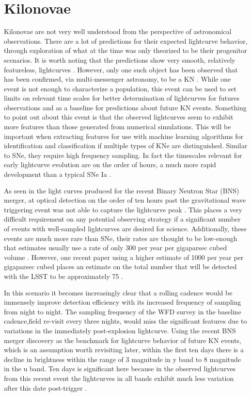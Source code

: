 \documentclass[12pt]{article}
\begin{document}
\section{Kilonovae} %
Kilonovae are not very well understood from the perspective of astronomical observations. There are a lot of predictions for their expected lightcurve behavior, through exploration of what at the time was only theorized to be their progenitor scenarios. It is worth noting that the predictions show very smooth, relatively featureless, lightcurves \citep{Rosswog2016a}. However, only one such object has been observed that has been confirmed, via multi-messenger astronomy, to be a KN \citep{Kasliwal2017}. While one event is not enough to characterize a population, this event can be used to set limits on relevant time scales for better determination of lightcurves for futures observations and as a baseline for predictions about future KN events. Something to point out about this event is that the observed lightcurves seem to exhibit more features than those generated from numerical simulations. This will be important when extracting features for use with machine learning algorithms for identification and classification if multiple types of KNe are distinguished. Similar to SNe, they require high frequency sampling. In fact the timescales relevant for early lightcurve evolution are on the order of hours, a much more rapid development than a typical SNe Ia \citep{Villar2017}. \par
As seen in the light curves produced for the recent Binary Neutron Star (BNS) merger, at optical detection on the order of ten hours past the gravitational wave triggering event was not able to capture the lightcurve peak \citep{Villar2017}. This places a very difficult requirement on any potential observing strategy if a significant number of events with well-sampled lightcurves are desired for science. Additionally, these events are much more rare than SNe, their rates are thought to be low-enough that estimates usually use a rate of only 300 per year per gigaparsec cubed volume \citep{Rosswog2016a}. However, one recent paper using a higher estimate of 1000 per year per gigaparsec cubed places an estimate on the total number that will be detected with the LSST to be approximately 75 \citep{Scolnic2017}.\par
In this scenario it becomes increasingly clear that a rolling cadence would be immensely improve detection efficiency with its increased frequency of sampling from night to night. The sampling frequency of the WFD survey in the baseline cadence,field re-visit every three nights, would miss the significant features due to variations in the immediately post-explosion lightcurve. Using the recent BNS merger discovery as the benchmark for lightcurve behavior of future KN events, which is an assumption worth revisiting later, within the first ten days there is a decline in brightness within the range of 3 magnitude in y band to 8 magnitude in the u band. Ten days is significant here because in the observed lightcurves from this recent event the lightcurves in all bands exhibit much less variation after this date post-trigger \citep{Villar2017}. \par
\end{document}
